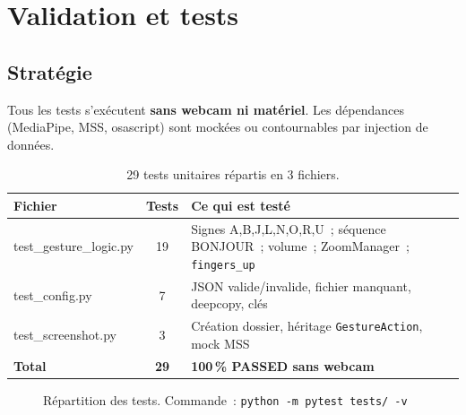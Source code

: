 \documentclass[12pt,a4paper]{article}
\begin{document}
\newpage

\section{Validation et tests}
\label{sec:tests}

\subsection{Strat\'egie}

Tous les tests s'ex\'ecutent \textbf{sans webcam ni mat\'eriel}. Les d\'ependances
(MediaPipe, MSS, osascript) sont mock\'ees ou contournables par injection de donn\'ees.

\begin{table}[H]
\centering
\caption{29 tests unitaires r\'epartis en 3 fichiers.}
\label{tab:tests}
\small
\begin{tabularx}{\textwidth}{>{\ttfamily}p{5.5cm} c X}
\toprule
\textbf{Fichier} & \textbf{Tests} & \textbf{Ce qui est test\'e} \\
\midrule
test\_gesture\_logic.py & 19 & Signes A,B,J,L,N,O,R,U~; s\'equence BONJOUR~;
                               volume~; ZoomManager~; \texttt{fingers\_up} \\
test\_config.py         &  7 & JSON valide/invalide, fichier manquant, deepcopy, cl\'es \\
test\_screenshot.py     &  3 & Cr\'eation dossier, h\'eritage \texttt{GestureAction}, mock MSS \\
\midrule
\textbf{Total} & \textbf{29} & \textbf{100\,\% PASSED sans webcam} \\
\bottomrule
\end{tabularx}
\end{table}

\begin{figure}[H]
\centering
{}
\caption{R\'epartition des tests. Commande~: \texttt{python -m pytest tests/ -v}}
\label{fig:tests}
\end{figure}
\end{document}
